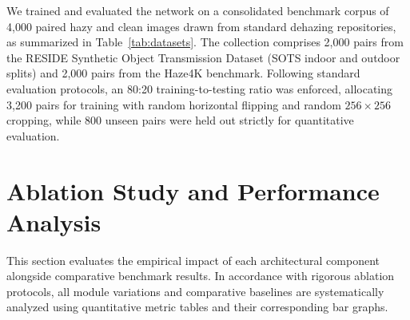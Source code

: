 \documentclass[journal]{IEEEtran}
\begin{document}
\begin{table}[!htb]
\centering
\caption{Benchmark Dehazing Datasets and Data Partitioning}
\label{tab:datasets}
\end{table}

We trained and evaluated the network on a consolidated benchmark corpus of 4,000 paired hazy and clean images drawn from standard dehazing repositories, as summarized in Table~\ref{tab:datasets}. The collection comprises 2,000 pairs from the RESIDE Synthetic Object Transmission Dataset (SOTS indoor and outdoor splits) and 2,000 pairs from the Haze4K benchmark. Following standard evaluation protocols, an 80:20 training-to-testing ratio was enforced, allocating 3,200 pairs for training with random horizontal flipping and random $256 \times 256$ cropping, while 800 unseen pairs were held out strictly for quantitative evaluation.

\section{Ablation Study and Performance Analysis}
This section evaluates the empirical impact of each architectural component alongside comparative benchmark results. In accordance with rigorous ablation protocols, all module variations and comparative baselines are systematically analyzed using quantitative metric tables and their corresponding bar graphs.
\end{document}
